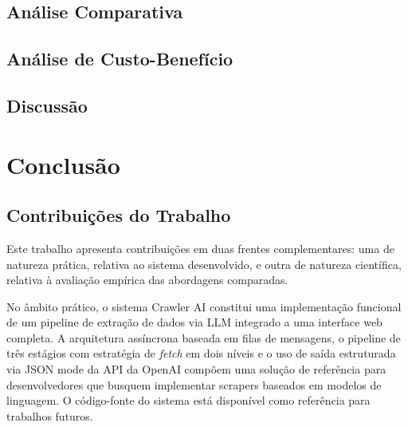 \documentclass[tcc,capa]{texifsul}
\begin{document}
\section{Análise Comparativa}


\section{Análise de Custo-Benefício}


\section{Discussão}


\chapter{Conclusão}
\label{cap:conclusao}


\section{Contribuições do Trabalho}

Este trabalho apresenta contribuições em duas frentes complementares: uma de natureza prática, relativa ao sistema desenvolvido, e outra de natureza científica, relativa à avaliação empírica das abordagens comparadas.

No âmbito prático, o sistema Crawler AI constitui uma implementação funcional de um pipeline de extração de dados via LLM integrado a uma interface web completa. A arquitetura assíncrona baseada em filas de mensagens, o pipeline de três estágios com estratégia de \textit{fetch} em dois níveis e o uso de saída estruturada via JSON mode da API da OpenAI compõem uma solução de referência para desenvolvedores que busquem implementar scrapers baseados em modelos de linguagem. O código-fonte do sistema está disponível como referência para trabalhos futuros.
\end{document}
